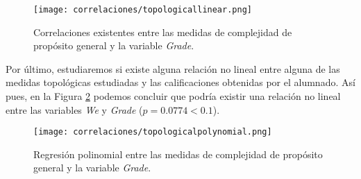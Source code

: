 \begin{figure}[H]
    \centering
    \texttt{[image: correlaciones/topologicallinear.png]}
    \caption{Correlaciones existentes entre las medidas de complejidad de propósito general y la variable \emph{Grade}.}
    \label{fig:correlations3}
\end{figure}

Por último, estudiaremos si existe alguna relación no lineal entre alguna de las medidas topológicas estudiadas y las calificaciones obtenidas por el alumnado. Así pues, en la Figura \ref{fig:correlations4} podemos concluir que podría existir una relación no lineal entre las variables \emph{We} y \emph{Grade} ($p = 0.0774 < 0.1$).

\begin{figure}[H]
    \centering
    \texttt{[image: correlaciones/topologicalpolynomial.png]}
    \caption{Regresión polinomial entre las medidas de complejidad de propósito general y la variable \emph{Grade}.}
    \label{fig:correlations4}
\end{figure}